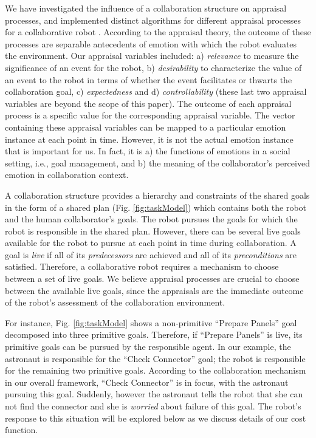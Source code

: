 \documentclass[conference]{IEEEtran}
\begin{document}
We have investigated the influence of a collaboration structure on
appraisal processes, and implemented distinct algorithms for different
appraisal processes for a collaborative robot \cite{shayganfar:appraisal}.
According to the appraisal theory, the outcome of these processes are separable
antecedents of emotion with which the robot evaluates the environment. Our
appraisal variables included: a) \textit{relevance} to measure the significance
of an event for the robot, b) \textit{desirability} to characterize the value of
an event to the robot in terms of whether the event facilitates or thwarts the
collaboration goal, c) \textit{expectedness} and d) \textit{controllability}
(these last two appraisal variables are beyond the scope of this paper). The
outcome of each appraisal process is a specific value for the corresponding
appraisal variable. The vector containing these appraisal variables can be
mapped to a particular emotion instance at each point in time. However, it is
not the actual emotion instance that is important for us. In fact, it is a) the
functions of emotions in a social setting, i.e., goal management, and b) the
meaning of the collaborator's perceived emotion in collaboration context.

A collaboration structure provides a hierarchy and constraints of the shared
goals in the form of a shared plan (Fig. \ref{fig:taskModel}) which contains
both the robot and the human collaborator's goals. The robot pursues the goals
for which the robot is responsible in the shared plan. However, there can be
several live goals available for the robot to pursue at each point in time
during collaboration. A goal is \textit{live} if all of its
\textit{predecessors} are achieved and all of its \textit{preconditions} are
satisfied. Therefore, a collaborative robot requires a mechanism to choose
between a set of live goals. We believe appraisal processes are crucial to
choose between the available live goals, since the appraisals are the immediate
outcome of the robot's assessment of the collaboration environment.

For instance, Fig. \ref{fig:taskModel} shows a non-primitive ``Prepare Panels''
goal decomposed into three primitive goals. Therefore, if ``Prepare Panels'' is
live, its primitive goals can be pursued by the responsible agent. In our
example, the astronaut is responsible for the ``Check Connector'' goal; the
robot is responsible for the remaining two primitive goals. According to the
collaboration mechanism in our overall framework, ``Check Connector'' is in
focus, with the astronaut pursuing this goal. Suddenly, however the astronaut
tells the robot that she can not find the connector and she is \textit{worried}
about failure of this goal. The robot's response to this situation will be
explored below as we discuss details of our cost function.
\end{document}
